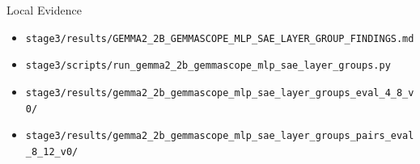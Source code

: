\documentclass[aspectratio=169]{beamer}
\begin{document}
\begin{frame}{Local Evidence}
  \small
  \begin{itemize}
    \item \texttt{stage3/results/GEMMA2\_2B\_GEMMASCOPE\_MLP\_SAE\_LAYER\_GROUP\_FINDINGS.md}
    \item \texttt{stage3/scripts/run\_gemma2\_2b\_gemmascope\_mlp\_sae\_layer\_groups.py}
    \item \texttt{stage3/results/gemma2\_2b\_gemmascope\_mlp\_sae\_layer\_groups\_eval\_4\_8\_v0/}
    \item \texttt{stage3/results/gemma2\_2b\_gemmascope\_mlp\_sae\_layer\_groups\_pairs\_eval\_8\_12\_v0/}
  \end{itemize}
\end{frame}
\end{document}
